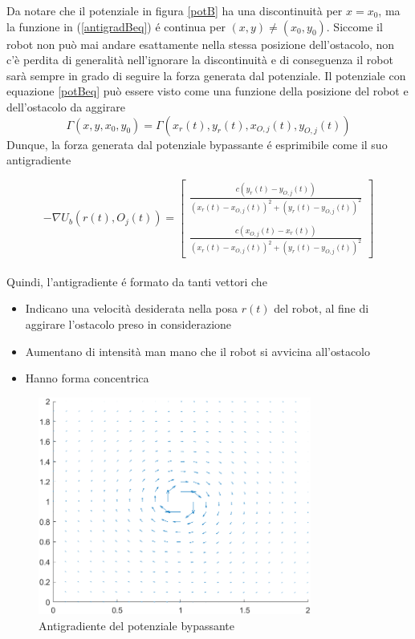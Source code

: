 \documentclass[14pt,a4paper]{extarticle}
\begin{document}
Da notare che il potenziale in figura \ref{potB} ha una discontinuità per \(x=x_0\), ma  la funzione in (\ref{antigradBeq}) é continua per \((x,y) \neq (x_0,y_0)\). Siccome il robot non può mai andare esattamente nella stessa posizione dell'ostacolo, non c'è perdita di generalità nell'ignorare la discontinuità e di conseguenza il robot sarà sempre in grado di seguire la forza generata dal potenziale. Il potenziale con equazione \ref{potBeq} può essere visto come una funzione della posizione del robot e dell'ostacolo da aggirare \[\Gamma(x,y,x_0,y_0) = \Gamma(x_r(t),y_r(t),x_{O,j}(t),y_{O,j}(t))\] Dunque, la forza generata dal potenziale bypassante é esprimibile come il suo antigradiente

\begin{equation}
\label{antigradBeq}
-\nabla U_b(r(t),O_j(t)) =
\begin{bmatrix}
\frac{c(y_r(t)-y_{O,j}(t))}{(x_r(t)-x_{O,j}(t))^2 + (y_r(t)-y_{O,j}(t))^2} \\\\
\frac{c(x_{O,j}(t) - x_r(t))}{(x_r(t)-x_{O,j}(t))^2 + (y_r(t)-y_{O,j}(t))^2}
\end{bmatrix}
\end{equation}\\

Quindi, l'antigradiente é formato da tanti vettori che
\begin{itemize}
\item Indicano una velocità desiderata nella posa \(r(t)\) del robot, al fine di aggirare l'ostacolo preso in considerazione  \item Aumentano di intensità man mano che il robot si avvicina all'ostacolo
\item Hanno forma concentrica
\end{itemize}

\begin{figure}[H]
\centering
\caption{Antigradiente del potenziale bypassante}
\label{antigradB}
\includegraphics[width=0.8\textwidth]{antigradB.png}
\end{figure}
\end{document}
